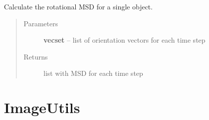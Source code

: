 \documentclass[letterpaper,10pt,english]{sphinxmanual}
\begin{document}

\begin{fulllineitems}
\label{AnalysisUtils:AnalysisUtils.calcMSDRotForCellTC}
Calculate the rotational MSD for a single object.
\begin{quote}\begin{description}
\item[{Parameters}] \leavevmode
\textbf{vecset} -- list of orientation vectors for each time step

\item[{Returns}] \leavevmode
list with MSD for each time step

\end{description}\end{quote}

\end{fulllineitems}



\chapter{ImageUtils}
\label{ImageUtils:imageutils}\label{ImageUtils::doc}
\end{document}
